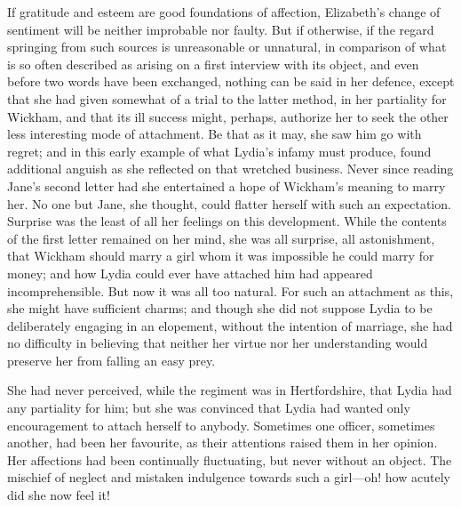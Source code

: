 \documentclass[12pt,openright]{book}
\begin{document}
If gratitude and esteem are good foundations of affection, Elizabeth’s change of sentiment will be neither improbable nor faulty. But if otherwise, if the regard springing from such sources is unreasonable or unnatural, in comparison of what is so often described as arising on a first interview with its object, and even before two words have been exchanged, nothing can be said in her defence, except that she had given somewhat of a trial to the latter method, in her partiality for Wickham, and that its ill success might, perhaps, authorize her to seek the other less interesting mode of attachment. Be that as it may, she saw him go with regret; and in this early example of what Lydia’s infamy must produce, found additional anguish as she reflected on that wretched business. Never since reading Jane’s second letter had she entertained a hope of Wickham’s meaning to marry her. No one but Jane, she thought, could flatter herself with such an expectation. Surprise was the least of all her feelings on this development. While the contents of the first letter remained on her mind, she was all surprise, all astonishment, that Wickham should marry a girl whom it was impossible he could marry for money; and how Lydia could ever have attached him had appeared incomprehensible. But now it was all too natural. For such an attachment as this, she might have sufficient charms; and though she did not suppose Lydia to be deliberately engaging in an elopement, without the intention of marriage, she had no difficulty in believing that neither her virtue nor her understanding would preserve her from falling an easy prey.

She had never perceived, while the regiment was in Hertfordshire, that Lydia had any partiality for him; but she was convinced that Lydia had wanted only encouragement to attach herself to anybody. Sometimes one officer, sometimes another, had been her favourite, as their attentions raised them in her opinion. Her affections had been continually fluctuating, but never without an object. The mischief of neglect and mistaken indulgence towards such a girl—oh! how acutely did she now feel it!
\end{document}
